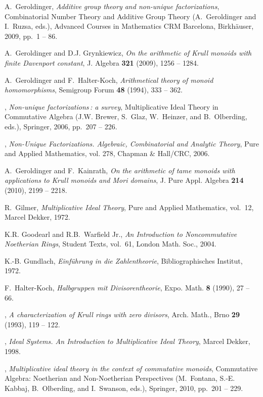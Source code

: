 \documentclass[a4paper]{amsart}
\theoremstyle{definition}
\numberwithin{equation}{section}
\begin{document}
\begin{thebibliography}{10}
A.~Geroldinger, \emph{Additive group theory and non-unique factorizations},
  Combinatorial {N}umber {T}heory and {A}dditive {G}roup {T}heory
  (A.~Geroldinger and I.~Ruzsa, eds.), Advanced Courses in Mathematics CRM
  Barcelona, Birkh{\"a}user, 2009, pp.~1 -- 86.

A.~Geroldinger and D.J. Grynkiewicz, \emph{On the arithmetic of {K}rull monoids
  with finite {D}avenport constant}, J. Algebra \textbf{321} (2009), 1256 --
  1284.

A.~Geroldinger and F.~Halter-Koch, \emph{Arithmetical theory of monoid
  homomorphisms}, Semigroup Forum \textbf{48} (1994), 333 -- 362.

\bysame, \emph{Non-unique factorizations{\rm \,:} a survey}, Multiplicative
  {I}deal {T}heory in {C}ommutative {A}lgebra (J.W. Brewer, S.~Glaz,
  W.~Heinzer, and B.~Olberding, eds.), Springer, 2006, pp.~207 -- 226.

\bysame, \emph{Non-{U}nique {F}actorizations. {A}lgebraic, {C}ombinatorial and
  {A}nalytic {T}heory}, Pure and Applied Mathematics, vol. 278, Chapman \&
  Hall/CRC, 2006.

A.~Geroldinger and F.~Kainrath, \emph{On the arithmetic of tame monoids with
  applications to {K}rull monoids and {M}ori domains}, J. Pure Appl. Algebra
  \textbf{214} (2010), 2199 -- 2218.

R.~Gilmer, \emph{Multiplicative {I}deal {T}heory}, Pure and Applied
  Mathematics, vol.~12, Marcel Dekker, 1972.

K.R. Goodearl and R.B.~Warfield Jr., \emph{An {I}ntroduction to
  {N}oncommutative {N}oetherian {R}ings}, Student Texts, vol.~61, London Math.
  Soc., 2004.

K.-B. Gundlach, \emph{Einf{\"{u}}hrung in die {Z}ahlentheorie},
  Bibliographisches {I}nstitut, 1972.

F.~Halter-Koch, \emph{Halbgruppen mit {D}ivisorentheorie}, Expo. Math.
  \textbf{8} (1990), 27 -- 66.

\bysame, \emph{A characterization of {K}rull rings with zero divisors}, Arch.
  Math., Brno \textbf{29} (1993), 119 -- 122.

\bysame, \emph{Ideal {S}ystems. {A}n {I}ntroduction to {M}ultiplicative {I}deal
  {T}heory}, Marcel Dekker, 1998.

\bysame, \emph{Multiplicative ideal theory in the context of commutative
  monoids}, Commutative {A}lgebra: {N}oetherian and {N}on-{N}oetherian
  {P}erspectives (M.~Fontana, S.-E. Kabbaj, B.~Olberding, and I.~Swanson,
  eds.), Springer, 2010, pp.~201 -- 229.


\end{thebibliography}
\end{document}

